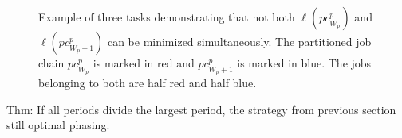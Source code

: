 \documentclass[10pt,conference]{resources/IEEEtran}
\theoremstyle{definition}
\newcommand{\pc}{{pc}}
\begin{document}
\begin{figure}
{	
		\label{fig:automotive_example:optimal_second}}
		\caption{Example of three tasks demonstrating that not both $\ell(\pc^p_{W_p})$ and $\ell(\pc^p_{W_p+1})$ can be minimized simultaneously. The partitioned job chain $\pc^p_{W_p}$ is marked in red and $\pc^p_{W_p+1}$ is marked in blue. The jobs belonging to both are half red and half blue.}
		\label{fig:automotive_example}
	\end{figure}

	





	Thm: If all periods divide the largest period, the strategy from previous section still optimal phasing.
\end{document}
